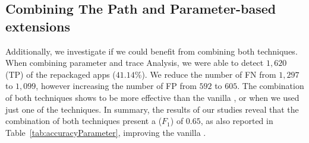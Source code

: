 \begin{table}[ht]
  \caption{Accuracy of the \mas with aid of complementary techniques (3,211 app pairs).}
  \label{tab:accuracyParameter}
\end{table}

\subsection{Combining The Path and Parameter-based extensions}

Additionally, we investigate if we could benefit from combining both techniques. When combining parameter and trace Analysis, we were able to detect $1,620$ (TP) of the repackaged apps ($41.14$\%). We reduce the number of FN from $1,297$ to $1,099$, however increasing the number of FP from $592$ to $605$. The combination of both techniques shows to be more effective than the vanilla \mas, or when we used just one of the techniques. In summary, the results of our studies reveal that the combination of both techniques present a ($F_1$) of $0.65$, as also reported in Table~\ref{tab:accuracyParameter}, improving the vanilla \mas.

